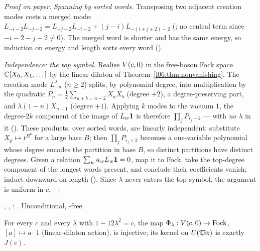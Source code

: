 \begin{proof}[Proof on paper]
\emph{Spanning by sorted words.} Transposing two adjacent creation modes costs a merged mode:
$L_{-i-2}L_{-j-2} = L_{-j-2}L_{-i-2} + (j-i)L_{-(i+j+2)-2}$ (; no central term since
$-i-2-j-2\ne0$). The merged word is shorter and has the same energy, so induction on energy and length
sorts every word ().

\emph{Independence: the top symbol.} Realise $V(c,0)$ in the free-boson Fock space
${\mathbb{C}}[X_0,X_1,\dots]$ by the linear dilaton of Theorem~\ref{l06:thm:nonvanishing}. The creation mode
$L^\lambda_{-n}$ ($n\ge2$) splits, by polynomial degree, into multiplication by the quadratic
$P_n = \frac12\sum_{a+b=n-2}X_aX_b$ (degree $+2$), a degree-preserving part, and $\lambda(1-n)X_{n-1}$
(degree $+1$). Applying $k$ modes to the vacuum $1$, the degree-$2k$ component of the image of
$L_w\mathbf{1}$ is therefore $\prod_jP_{i_j+2}$ --- with \emph{no} $\lambda$ in it
(). These products, over sorted words, are linearly independent: substitute
$X_p\mapsto t^{B^p}$ for a large base $B$; then $\prod_jP_{i_j+2}$ becomes a one-variable polynomial
whose degree encodes the partition in base $B$, so distinct partitions have distinct degrees. Given a
relation $\sum_wa_wL_w\mathbf{1} = 0$, map it to Fock, take the top-degree component of the longest words
present, and conclude their coefficients vanish; induct downward on length
(). Since $\lambda$ never enters the top symbol, the argument is uniform in $c$.
\end{proof}

\begin{status}
\allowbreak{}\allowbreak{}, \allowbreak{}\allowbreak{}\allowbreak{},
\allowbreak{}\allowbreak{}\allowbreak{}\allowbreak{}: \lean{[propext, Classical.}\allowbreak{}\allowbreak\lean{sound]}.
Unconditional, -free.
\end{status}

\begin{theorem}\label{l06:thm:ffembed}
For every $c$ and every $\lambda$ with $1-12\lambda^2 = c$, the map $\Phi_\lambda:V(c,0)\to\mathrm{Fock}$,
$[a]\mapsto a\cdot1$ (linear-dilaton action), is injective; its kernel on $U(\mathfrak{Vir})$ is exactly $J(c)$.
\end{theorem}


